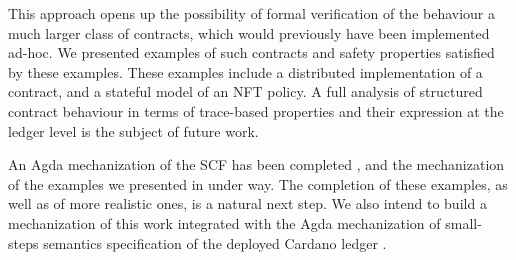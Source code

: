 This approach opens up the possibility of formal verification of the behaviour
a much larger class of contracts, which would previously have been implemented ad-hoc.
We presented examples of such contracts and safety properties satisfied by these examples.
These examples include a distributed implementation of a contract, and a stateful
model of an NFT policy.
A full analysis of structured contract behaviour in terms of trace-based
properties and their expression at the ledger level is the subject of future work.

An Agda mechanization of the SCF has been completed \cite{agda-structured}, and
the mechanization of the examples we presented in under way. The completion of
these examples, as well as of more realistic ones, is a natural next step.
We also intend to build a mechanization of this work
integrated with the Agda mechanization of small-steps semantics specification
of the deployed Cardano ledger \cite{cardano-agda}.


%
%
%
%
%



